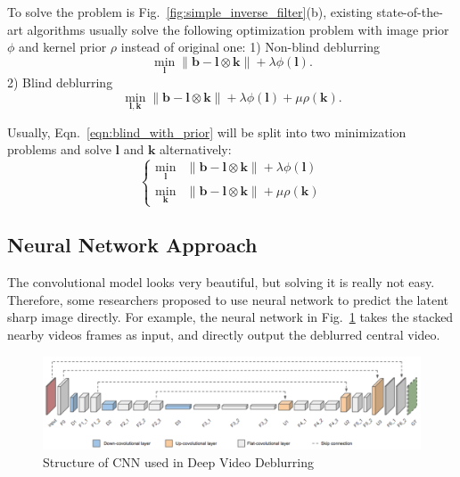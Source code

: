\documentclass[journal, onecolumn, 10pt]{IEEEtran}
\begin{document}
To solve the problem is Fig.~\ref*{fig:simple_inverse_filter}(b), existing state-of-the-art algorithms usually solve the following optimization problem with image prior $\phi$ and kernel prior $\rho$ instead of original one: 1) Non-blind deblurring
\begin{equation}
\min_{\mathbf{l}} \| \mathbf{b} - \mathbf{l} \otimes \mathbf{k} \| + \lambda\phi(\mathbf{l}).
\label{eqn:non_blind_with_prior}
\end{equation}
2) Blind deblurring
\begin{equation}
\min_{\mathbf{l}, \mathbf{k}} \| \mathbf{b} - \mathbf{l} \otimes \mathbf{k} \| + \lambda\phi(\mathbf{l}) + \mu \rho(\mathbf{k}).
\label{eqn:blind_with_prior}
\end{equation}

Usually, Eqn.~\ref{eqn:blind_with_prior} will be split into two minimization problems and solve  $\mathbf{l}$ and $\mathbf{k}$ alternatively:
\begin{equation}
\begin{cases}
\min_{\mathbf{l}}&\| \mathbf{b} - \mathbf{l} \otimes \mathbf{k} \| + \lambda\phi(\mathbf{l}) \\
\min_{\mathbf{k}}&\| \mathbf{b} - \mathbf{l} \otimes \mathbf{k} \| + \mu \rho(\mathbf{k})
\end{cases}
\label{eqn:blind_with_prior_alternative}
\end{equation}


\subsection{Neural Network Approach}
The convolutional model looks very beautiful, but solving it is really not easy. Therefore, some researchers proposed to use neural network to predict the latent sharp image directly. For example, the neural network in Fig.~\ref{fig:deep_video_deblurring_cnn} takes the stacked nearby videos frames as input, and directly output the deblurred central video. 

\begin{figure}[h!]
\centering
\includegraphics[width = 1\textwidth]{pic/deep_video_deblurring_cnn.png}
\caption{Structure of CNN used in Deep Video Deblurring\cite{su2016deep}}
\label{fig:deep_video_deblurring_cnn}
\end{figure}
\end{document}
